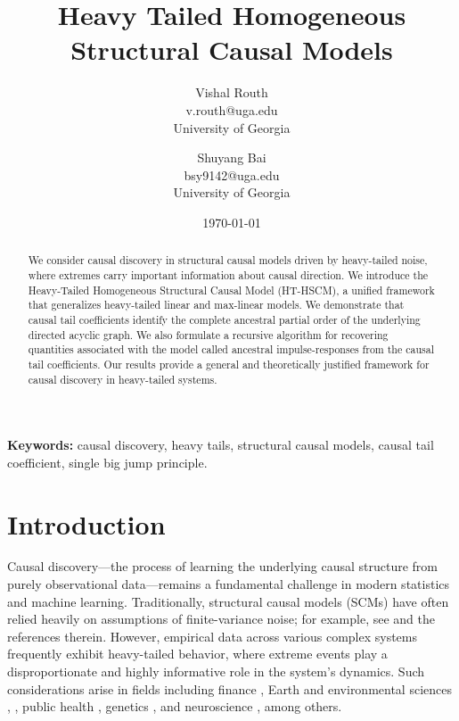 \documentclass[10pt]{article}
\title{Heavy Tailed Homogeneous Structural Causal Models}
\author{
Vishal Routh\\
v.routh@uga.edu\\
University of Georgia
\and
Shuyang Bai\\
bsy9142@uga.edu\\
University of Georgia
}
\date{\today}
\begin{document}
\maketitle


\begin{abstract}
We consider causal discovery in structural causal models driven by heavy-tailed noise, where extremes carry important information about causal direction. We introduce the Heavy-Tailed Homogeneous Structural Causal Model (HT-HSCM), a unified framework that generalizes heavy-tailed linear and max-linear models. We demonstrate that causal tail coefficients identify the complete ancestral partial order of the underlying directed acyclic graph. We also formulate a recursive algorithm for recovering quantities associated with the model called ancestral impulse-responses  from the causal tail coefficients. Our results provide a general and theoretically justified framework for causal discovery in heavy-tailed systems.
\end{abstract}
\noindent
\textbf{Keywords:} causal discovery, heavy tails, structural causal models,  causal tail coefficient, single big jump principle.

\section{Introduction}

Causal discovery---the process of learning the underlying causal structure from purely observational data---remains a fundamental challenge in modern statistics and machine learning. Traditionally, structural causal models (SCMs) have often relied heavily on assumptions  of finite-variance noise; for example, see \cite{chaudhuri2025consistent} and the references therein.  However, empirical data across various complex systems frequently exhibit heavy-tailed behavior, where extreme events play a disproportionate and highly informative role in the system's dynamics. Such considerations arise in fields including finance \cite{chuang2009causality}, Earth and environmental sciences \cite{sun2021causal}, \cite{mhalla2020causal}, public health \cite{chernozhukov2011inference}, genetics \cite{duncan2011genome}, and neuroscience \cite{zanin2016causality}, among others.
\end{document}
